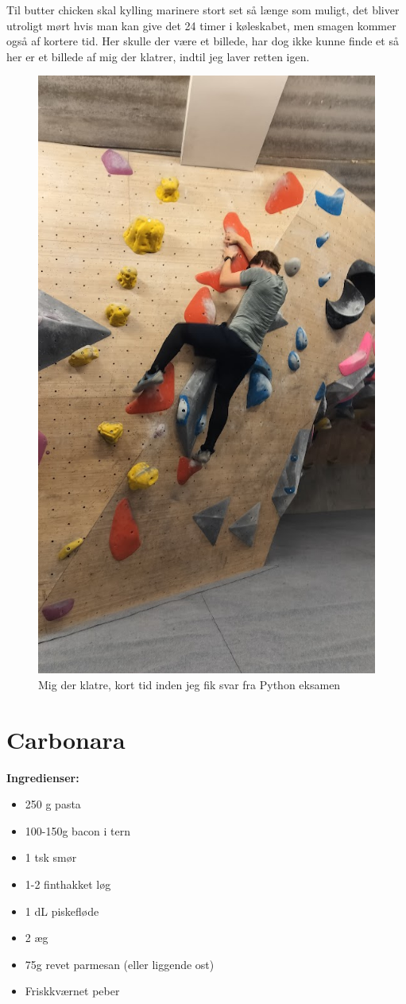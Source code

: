 \documentclass{book}
\begin{document}
Til butter chicken skal kylling marinere stort set så længe som muligt, det bliver utroligt mørt hvis man kan give det 24 timer i køleskabet, men smagen kommer også af kortere tid.
\newpage Her skulle der være et billede, har dog ikke kunne finde et så her er et billede af mig der klatrer, indtil jeg laver retten igen.
\begin{figure}
    \centering
    \includegraphics[width=0.5\linewidth]{Klatring.jpg}
    \caption{Mig der klatre, kort tid inden jeg fik svar fra Python eksamen}
    \label{fig:Klatring}
\end{figure}
\newpage \section{Carbonara}
\begin{minipage}[t]{0.5\textwidth}
\textbf{Ingredienser:}
\begin{itemize}
    \item 250 g pasta
    \item 100-150g bacon i tern
    \item 1 tsk smør
    \item 1-2 finthakket løg
    \item 1 dL piskefløde
    \item 2 æg
    \item 75g revet parmesan (eller liggende ost)
    \item Friskkværnet peber
\end{itemize}
\end{minipage}
\end{document}
